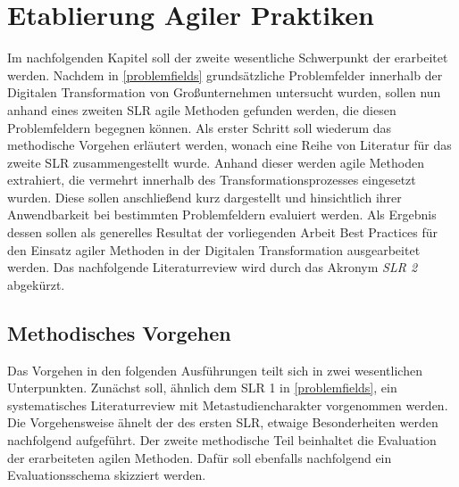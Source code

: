 \chapter{Etablierung Agiler Praktiken}
\label{agilepractices}


Im nachfolgenden Kapitel soll der zweite wesentliche Schwerpunkt der erarbeitet werden. Nachdem in \ref{problemfields} grundsätzliche Problemfelder innerhalb der Digitalen Transformation von Großunternehmen untersucht wurden, sollen nun anhand eines zweiten SLR agile Methoden gefunden werden, die diesen Problemfeldern begegnen können. Als erster Schritt soll wiederum das methodische Vorgehen erläutert werden, wonach eine Reihe von Literatur für das zweite SLR zusammengestellt wurde. Anhand dieser werden agile Methoden extrahiert, die vermehrt innerhalb des Transformationsprozesses eingesetzt wurden. Diese sollen anschließend kurz dargestellt und hinsichtlich ihrer Anwendbarkeit bei bestimmten Problemfeldern evaluiert werden. Als Ergebnis dessen sollen als generelles Resultat der vorliegenden Arbeit Best Practices für den Einsatz agiler Methoden in der Digitalen Transformation ausgearbeitet werden. Das nachfolgende Literaturreview wird durch das Akronym \textit{SLR 2} abgekürzt.

\section{Methodisches Vorgehen}
\label{agilepractices:methods}


Das Vorgehen in den folgenden Ausführungen teilt sich in zwei wesentlichen Unterpunkten. Zunächst soll, ähnlich dem SLR 1 in \ref{problemfields}, ein systematisches Literaturreview mit Metastudiencharakter vorgenommen werden. Die Vorgehensweise ähnelt der des ersten SLR, etwaige Besonderheiten werden nachfolgend aufgeführt. Der zweite  methodische Teil beinhaltet die Evaluation der erarbeiteten agilen Methoden. Dafür soll ebenfalls nachfolgend ein Evaluationsschema skizziert werden.

